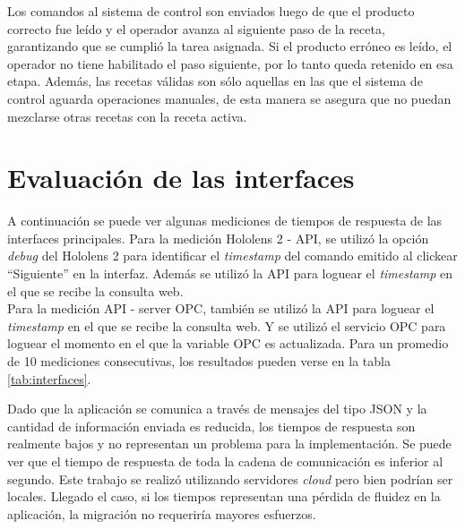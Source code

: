 Los comandos al sistema de control son enviados luego de que el producto correcto fue leído y el operador avanza al siguiente paso de la receta, garantizando que se cumplió la tarea asignada. Si el producto erróneo es leído, el operador no tiene habilitado el paso siguiente, por lo tanto queda retenido en esa etapa. Además, las recetas válidas son sólo aquellas en las que el sistema de control aguarda operaciones manuales, de esta manera se asegura que no puedan mezclarse otras recetas con la receta activa.

\section{Evaluación de las interfaces}
\label{sec:pruebasHW}

A continuación se puede ver algunas mediciones de tiempos de respuesta de las interfaces principales. Para la medición Hololens 2 - API, se utilizó la opción \textit{debug} del Hololens 2 para identificar el \textit{timestamp} del comando emitido al clickear ``Siguiente'' en la interfaz. Además se utilizó la API para loguear el \textit{timestamp} en el que se recibe la consulta web.\\

Para la medición API - server OPC, también se utilizó la API para loguear el \textit{timestamp} en el que se recibe la consulta web. Y se utilizó el servicio OPC para loguear el momento en el que la variable OPC es actualizada. Para un promedio de 10 mediciones consecutivas, los resultados pueden verse en la tabla \ref{tab:interfaces}.

\begin{table}[htpb]
	\centering
	\caption[Tiempos de respuesta]{Tiempos de respuesta promedio}
	\label{tab:interfaces}
\end{table}

Dado que la aplicación se comunica a través de mensajes del tipo JSON y la cantidad de información enviada es reducida, los tiempos de respuesta son realmente bajos y no representan un problema para la implementación. Se puede ver que el tiempo de respuesta de toda la cadena de comunicación es inferior al segundo. Este trabajo se realizó utilizando servidores \textit{cloud} pero bien podrían ser locales. Llegado el caso, si los tiempos representan una pérdida de fluidez en la aplicación, la migración no requeriría mayores esfuerzos. 

